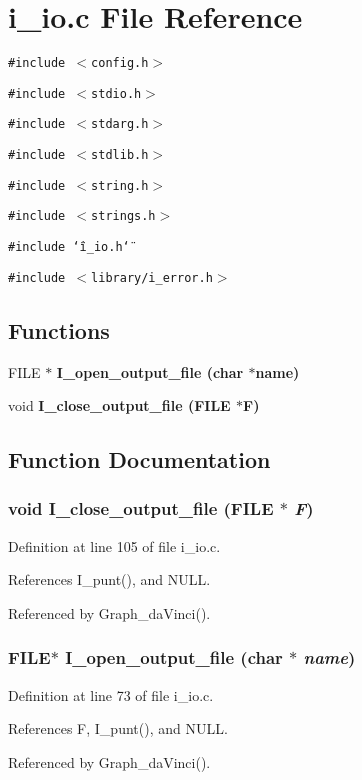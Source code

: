 \section{i\_\-io.c File Reference}
\label{i__io_8c}
{\tt \#include $<$config.h$>$}\par
{\tt \#include $<$stdio.h$>$}\par
{\tt \#include $<$stdarg.h$>$}\par
{\tt \#include $<$stdlib.h$>$}\par
{\tt \#include $<$string.h$>$}\par
{\tt \#include $<$strings.h$>$}\par
{\tt \#include \char`\"{}i\_\-io.h\char`\"{}}\par
{\tt \#include $<$library/i\_\-error.h$>$}\par
\subsection*{Functions}
\begin{CompactItemize}
\item 
FILE $\ast$ \bf{I\_\-open\_\-output\_\-file} (char $\ast$\bf{name})
\item 
void \bf{I\_\-close\_\-output\_\-file} (FILE $\ast$\bf{F})
\end{CompactItemize}


\subsection{Function Documentation}
\subsubsection{\setlength{\rightskip}{0pt plus 5cm}void I\_\-close\_\-output\_\-file (FILE $\ast$ {\em F})}\label{i__io_8c_848046b76989ff3215134feef9387ce7}




Definition at line 105 of file i\_\-io.c.

References I\_\-punt(), and NULL.

Referenced by Graph\_\-da\-Vinci().
\subsubsection{\setlength{\rightskip}{0pt plus 5cm}FILE$\ast$ I\_\-open\_\-output\_\-file (char $\ast$ {\em name})}\label{i__io_8c_35fb56d4f414c161ac44e6d7b3b5594a}




Definition at line 73 of file i\_\-io.c.

References F, I\_\-punt(), and NULL.

Referenced by Graph\_\-da\-Vinci().